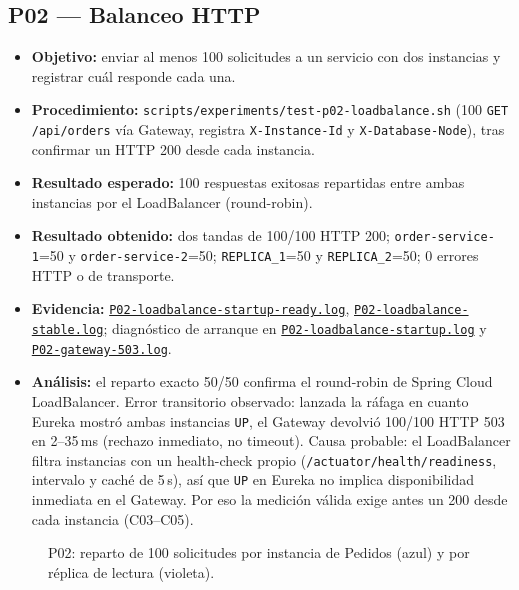 \documentclass[
  spanish,
  a4paper,
  11pt
]{article}
\providecommand{\tightlist}{\setlength{\itemsep}{0pt}\setlength{\parskip}{0pt}}
\newcommand{\evid}[1]{\href{https://github.com/yan2005dris-afk/SDCC---microservices-with-gateway-and-loadbalancer/blob/develop/docs/evidencias/#1}{{\urlstyle{tt}\nolinkurl{#1}}}}
\begin{document}
\subsection{P02 --- Balanceo HTTP}
\begin{itemize}
\tightlist
\item \textbf{Objetivo:} enviar al menos 100 solicitudes a un servicio con dos instancias y registrar cuál responde cada una.
\item \textbf{Procedimiento:} \texttt{scripts/experiments/test-p02-loadbalance.sh} (100 \texttt{GET /api/orders} vía Gateway, registra \texttt{X-Instance-Id} y \texttt{X-Database-Node}), tras confirmar un HTTP 200 desde cada instancia.
\item \textbf{Resultado esperado:} 100 respuestas exitosas repartidas entre ambas instancias por el LoadBalancer (round-robin).
\item \textbf{Resultado obtenido:} dos tandas de 100/100 HTTP 200; \texttt{order-service-1}=50 y \texttt{order-service-2}=50; \texttt{REPLICA\_1}=50 y \texttt{REPLICA\_2}=50; 0 errores HTTP o de transporte.
\item \textbf{Evidencia:} \evid{P02-loadbalance-startup-ready.log}, \evid{P02-loadbalance-stable.log}; diagnóstico de arranque en \evid{P02-loadbalance-startup.log} y \evid{P02-gateway-503.log}.
\item \textbf{Análisis:} el reparto exacto 50/50 confirma el round-robin de Spring Cloud LoadBalancer. Error transitorio observado: lanzada la ráfaga en cuanto Eureka mostró ambas instancias \texttt{UP}, el Gateway devolvió 100/100 HTTP 503 en 2--35\,ms (rechazo inmediato, no timeout). Causa probable: el LoadBalancer filtra instancias con un health-check propio (\texttt{/actuator/health/readiness}, intervalo y caché de 5\,s), así que \texttt{UP} en Eureka no implica disponibilidad inmediata en el Gateway. Por eso la medición válida exige antes un 200 desde cada instancia (C03--C05).
\end{itemize}

\begin{figure}[H]
\centering
{}
\caption{P02: reparto de 100 solicitudes por instancia de Pedidos (azul) y por réplica de lectura (violeta).}
\label{fig:p02}
\end{figure}
\end{document}

